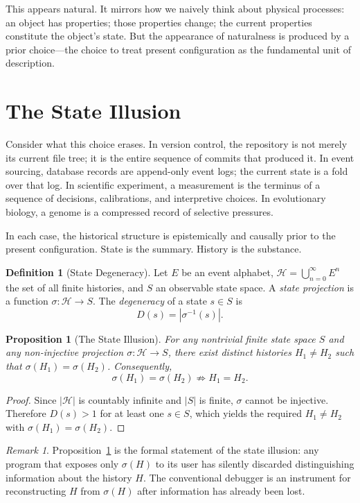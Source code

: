 \documentclass[12pt, a4paper, openany]{book}
\theoremstyle{plain}
\newtheorem{proposition}[theorem]{Proposition}
\theoremstyle{definition}
\newtheorem{definition}[theorem]{Definition}
\theoremstyle{remark}
\newtheorem{remark}[theorem]{Remark}
\newcommand{\calH}{\mathcal{H}}
\begin{document}
This appears natural. It mirrors how we naively think about physical processes: an
object has properties; those properties change; the current properties constitute
the object's state. But the appearance of naturalness is produced by a prior
choice---the choice to treat present configuration as the fundamental unit of
description.

\section{The State Illusion}

Consider what this choice erases. In version control, the repository is not merely
its current file tree; it is the entire sequence of commits that produced it. In
event sourcing, database records are append-only event logs; the current state is
a fold over that log. In scientific experiment, a measurement is the terminus of
a sequence of decisions, calibrations, and interpretive choices. In evolutionary
biology, a genome is a compressed record of selective pressures.

In each case, the historical structure is epistemically and causally prior to the
present configuration. State is the summary. History is the substance.

\begin{definition}[State Degeneracy]
Let $E$ be an event alphabet, $\calH = \bigcup_{n=0}^{\infty} E^n$ the set of all
finite histories, and $S$ an observable state space. A \emph{state projection} is
a function $\sigma : \calH \to S$. The \emph{degeneracy} of a state $s \in S$ is
\[
D(s) = |\sigma^{-1}(s)|.
\]
\end{definition}

\begin{proposition}[The State Illusion]
\label{prop:state-illusion}
For any nontrivial finite state space $S$ and any non-injective projection
$\sigma : \calH \to S$, there exist distinct histories $H_1 \neq H_2$ such that
$\sigma(H_1) = \sigma(H_2)$. Consequently,
\[
\sigma(H_1) = \sigma(H_2) \not\Rightarrow H_1 = H_2.
\]
\end{proposition}

\begin{proof}
Since $|\calH|$ is countably infinite and $|S|$ is finite, $\sigma$ cannot be
injective. Therefore $D(s) > 1$ for at least one $s \in S$, which yields the
required $H_1 \neq H_2$ with $\sigma(H_1) = \sigma(H_2)$.
\end{proof}

\begin{remark}
Proposition~\ref{prop:state-illusion} is the formal statement of the state
illusion: any program that exposes only $\sigma(H)$ to its user has silently
discarded distinguishing information about the history $H$. The conventional
debugger is an instrument for reconstructing $H$ from $\sigma(H)$ after
information has already been lost.
\end{remark}
\end{document}
